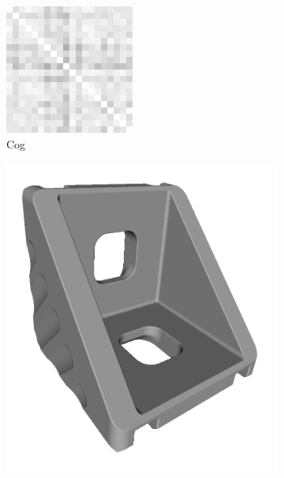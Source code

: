 \begin{figure}[ht]
\begin{subfigure}[b]{0.20\linewidth}
		\includegraphics[width=\linewidth]{fig/3dreg/reg3Dtrain_cog.png} 
		\caption{Cog}
	\end{subfigure}
	\begin{subfigure}[b]{0.20\linewidth}
		\includegraphics[width=\linewidth]{fig/3dreg/bracket.png} \\

\end{subfigure}
\end{figure}
